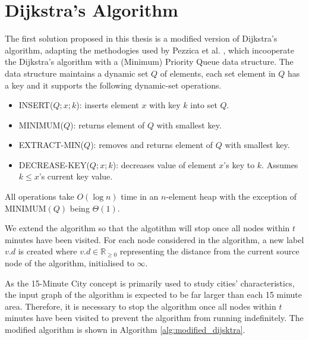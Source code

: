 \section{Dijkstra's Algorithm}

The first solution proposed in this thesis is a modified version of Dijkstra's algorithm, adapting the methodogies used by Pezzica et al. \cite{cormen2022introduction}, which incooperate the Dijkstra's algorithm with a (Minimum) Priority Queue data structure. The data structure maintains a dynamic set $Q$ of elements, each set element in $Q$ has a key and it supports the following dynamic-set operations.

\begin{itemize}
    \item INSERT($Q; x; k$): inserts element $x$ with key $k$ into set $Q$.
    \item MINIMUM($Q$): returns element of $Q$ with smallest key.
    \item EXTRACT-MIN($Q$): removes and returns element of $Q$ with smallest key.
    \item DECREASE-KEY($Q;x;k$): decreases value of element $x$'s key to $k$. Assumes $k\leq x$'s current key value.
\end{itemize}

All operations take $O(\log n)$ time in an $n$-element heap with the exception of $\text{MINIMUM}(Q)$ being $\Theta(1)$.

We extend the algorithm so that the algotithm will stop once all nodes within $t$ minutes have been visited. For each node considered in the algorithm, a new label $v.d$ is created where $v.d \in \mathbb{R}_{\geq 0}$ representing the distance from the current source node of the algorithm, initialised to $\infty$.

As the 15-Minute City concept is primarily used to study cities' characteristics, the input graph of the algorithm is expected to be far larger than each 15 minute area. Therefore, it is necessary to stop the algorithm once all nodes within $t$ minutes have been visited to prevent the algorithm from running indefinitely. The modified algorithm is shown in Algorithm \ref{alg:modified_dijsktra}.

